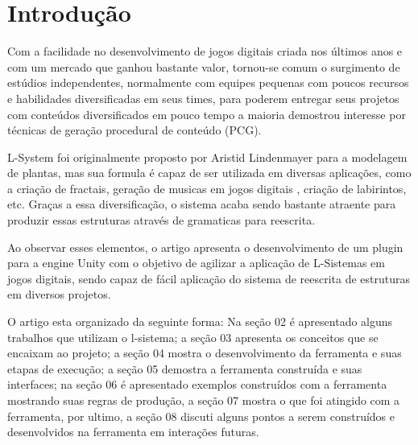 \section{Introdução}
Com a facilidade no desenvolvimento de jogos digitais criada nos últimos anos e com um mercado que ganhou bastante valor, tornou-se comum o surgimento de estúdios independentes, normalmente com equipes pequenas com poucos recursos e habilidades diversificadas em seus times, para poderem entregar seus projetos com conteúdos diversificados em pouco tempo a maioria demostrou interesse por técnicas de geração procedural de conteúdo (PCG).

L-System\cite{Prusinkiewicz} foi originalmente proposto por Aristid Lindenmayer para a modelagem de plantas, mas sua formula é capaz de ser utilizada em diversas aplicações, como a criação de fractais, geração de musicas em jogos digitais \cite{Fridenfalk} , criação de labirintos, etc. Graças a essa diversificação, o sistema acaba sendo bastante atraente para produzir essas estruturas através de gramaticas para reescrita.


Ao observar esses elementos, o artigo apresenta o desenvolvimento de um plugin para a engine Unity com o objetivo de agilizar a aplicação de L-Sistemas em jogos digitais, sendo capaz de fácil aplicação do sistema de reescrita de estruturas em diversos projetos.

O artigo esta organizado da seguinte forma: Na seção 02 é apresentado alguns trabalhos que utilizam o l-sistema; a seção 03 apresenta os conceitos que se encaixam ao projeto; a seção 04 mostra o desenvolvimento da ferramenta e suas etapas de execução; a seção 05 demostra a ferramenta construída e suas interfaces; na seção 06 é apresentado exemplos construídos com a ferramenta mostrando suas regras de produção, a seção 07 mostra o que foi atingido com a ferramenta, por ultimo, a seção 08 discuti alguns pontos a serem construídos e desenvolvidos na ferramenta em interações futuras.
